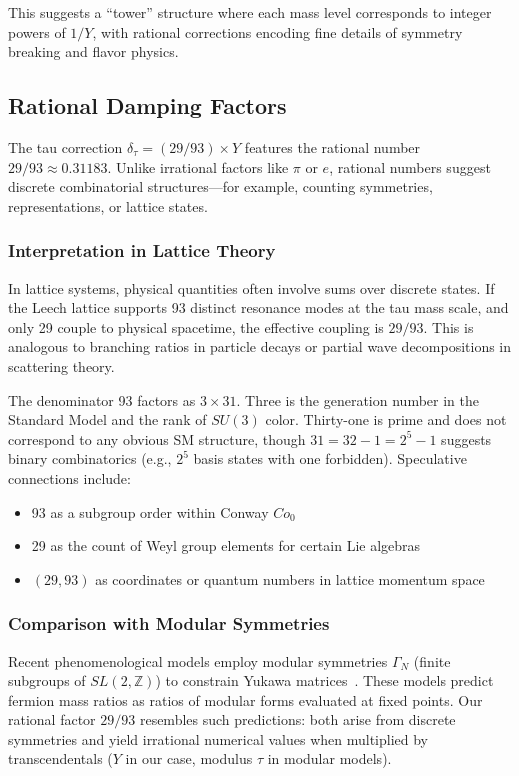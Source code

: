 \documentclass[11pt,a4paper]{article}
\begin{document}
This suggests a ``tower'' structure where each mass level corresponds to integer powers of $1/Y$, with rational corrections encoding fine details of symmetry breaking and flavor physics.

\subsection{Rational Damping Factors}

The tau correction $\delta_\tau = (29/93) \times Y$ features the rational number $29/93 \approx 0.31183$. Unlike irrational factors like $\pi$ or $e$, rational numbers suggest discrete combinatorial structures—for example, counting symmetries, representations, or lattice states.

\subsubsection{Interpretation in Lattice Theory}

In lattice systems, physical quantities often involve sums over discrete states. If the Leech lattice supports 93 distinct resonance modes at the tau mass scale, and only 29 couple to physical spacetime, the effective coupling is $29/93$. This is analogous to branching ratios in particle decays or partial wave decompositions in scattering theory.

The denominator 93 factors as $3 \times 31$. Three is the generation number in the Standard Model and the rank of $SU(3)$ color. Thirty-one is prime and does not correspond to any obvious SM structure, though $31 = 32 - 1 = 2^5 - 1$ suggests binary combinatorics (e.g., $2^5$ basis states with one forbidden). Speculative connections include:
\begin{itemize}
\item 93 as a subgroup order within Conway $Co_0$
\item 29 as the count of Weyl group elements for certain Lie algebras
\item $(29, 93)$ as coordinates or quantum numbers in lattice momentum space
\end{itemize}

\subsubsection{Comparison with Modular Symmetries}

Recent phenomenological models employ modular symmetries $\Gamma_N$ (finite subgroups of $SL(2,\mathbb{Z})$) to constrain Yukawa matrices~\cite{ref001,ref006}. These models predict fermion mass ratios as ratios of modular forms evaluated at fixed points. Our rational factor $29/93$ resembles such predictions: both arise from discrete symmetries and yield irrational numerical values when multiplied by transcendentals ($Y$ in our case, modulus $\tau$ in modular models).
\end{document}
